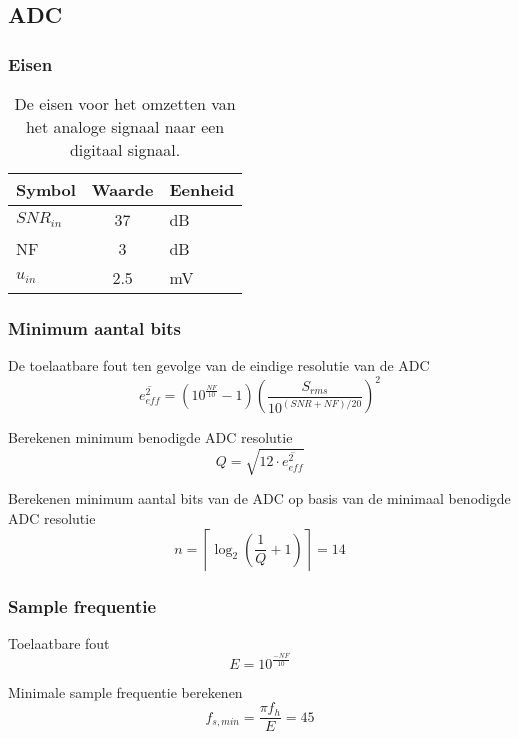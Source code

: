     \subsection*{ADC}
    \begin{frame}
        \frametitle{Eisen}
    
        \begin{table}[ht]
    \centering
    \begin{tabular}{l|c|l}
        Symbol      & Waarde & Eenheid\\\hline
        $SNR_{in}$  & 37        & dB\\
        NF          & 3         & dB\\
        $u_{in}$    & 2.5       & mV\\
    \end{tabular}
    \caption{De eisen voor het omzetten van het analoge signaal naar een digitaal signaal.}
    \label{tab:systemSpecADC}
\end{table}
    
    \end{frame}
    \begin{frame}
        \frametitle{Minimum aantal bits}
        \centering

        De toelaatbare fout ten gevolge van de eindige resolutie van de ADC
        \begin{equation}\label{eq:calcSpecifiedRmsError}
            \overline{e_{eff}^2}=\left(10^{\frac{NF}{10}}-1\right)\left(\frac{S_{rms}}{10^{\left(SNR+NF\right)/20}}\right)^2
        \end{equation}
        \pause

        Berekenen minimum benodigde ADC resolutie
        \begin{equation}\label{eq:calcNeededQ}
            Q=\sqrt{12\cdot\overline{e_{eff}^2}}
        \end{equation}
        \pause

        Berekenen minimum aantal bits van de ADC op basis van de minimaal benodigde ADC resolutie 
        \begin{equation}\label{eq:calcMinNumberADCbits}
            n=\left\lceil\log_2\left(\frac{1}{Q}+1\right)\right\rceil=14
        \end{equation}
    
    \end{frame}

    \begin{frame}
        \frametitle{Sample frequentie}
        \centering
        
        Toelaatbare fout
        \begin{equation}\label{eq:ADCmaxSampleError}
            E=10^{\frac{-NF}{10}}
        \end{equation}
        \pause

        Minimale sample frequentie berekenen
        \begin{equation}\label{eq:ADCminFs}
            f_{s,min}=\frac{\pi f_h}{E}=45
        \end{equation}
    
    \end{frame}

